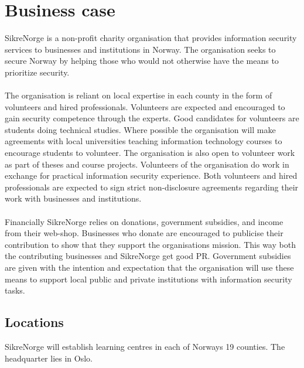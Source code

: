 \thispagestyle{empty}

\clearpage
{}
\setcounter{page}{1}
\tableofcontents

\clearpage
{}


\section{Business case}

SikreNorge is a non-profit charity organisation that provides information security services to businesses and institutions in Norway. The organisation seeks to secure Norway by helping those who would not otherwise have the means to prioritize security.
\\
\\
The organisation is reliant on local expertise in each county in the form of volunteers and hired professionals. Volunteers are expected and encouraged to gain security competence through the experts. Good candidates for volunteers are students doing technical studies. Where possible the organisation will make agreements with local universities teaching information technology courses to encourage students to volunteer. The organisation is also open to volunteer work as part of theses and course projects. Volunteers of the organisation do work in exchange for practical information security experience. Both volunteers and hired professionals are expected to sign strict non-disclosure agreements regarding their work with businesses and institutions.
\\
\\
Financially SikreNorge relies on donations, government subsidies, and income from their web-shop. Businesses who donate are encouraged to publicise their contribution to show that they support the organisations mission. This way both the contributing businesses and SikreNorge get good PR. Government subsidies are given with the intention and expectation that the organisation will use these means to support local public and private institutions with information security tasks.

\subsection{Locations}

SikreNorge will establish learning centres in each of Norways 19 counties. The headquarter lies in Oslo.

